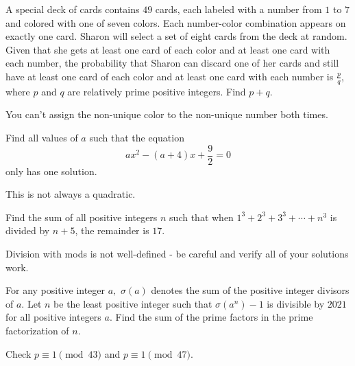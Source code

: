 \documentclass[mast]{lucky}
\begin{document}
\begin{prob}[AIME II 2017/9]{6}
A special deck of cards contains $49$ cards, each labeled with a number from $1$ to $7$ and colored with one of seven colors. Each number-color combination appears on exactly one card. Sharon will select a set of eight cards from the deck at random. Given that she gets at least one card of each color and at least one card with each number, the probability that Sharon can discard one of her cards and still have at least one card of each color and at least one card with each number is $\frac{p}{q}$, where $p$ and $q$ are relatively prime positive integers. Find $p+q$.
\begin{mistakes}
    \begin{mistake}
        You can't assign the non-unique color to the non-unique number both times.
    \end{mistake}
\end{mistakes}
\end{prob}

\begin{prob}[NARML 2020/3]{6}
Find all values of $a$ such that the equation \[ax^2-(a+4)x+\frac{9}{2}=0\] only has one solution.
\begin{mistakes}
    \begin{mistake}
        This is not always a quadratic.
    \end{mistake}
\end{mistakes}
\end{prob}
    
\begin{prob}[AIME II 2020/10]{6}
Find the sum of all positive integers $n$ such that when $1^3+2^3+3^3+\cdots+n^3$ is divided by $n+5$, the remainder is $17.$
\begin{mistakes}
    \begin{mistake}
        Division with mods is not well-defined - be careful and verify all of your solutions work.
    \end{mistake}
\end{mistakes}
\end{prob}

\begin{prob}[AIME I 2021/14]{6}
For any positive integer $a,$ $\sigma(a)$ denotes the sum of the positive integer divisors of $a.$ Let $n$ be the least positive integer such that $\sigma(a^n)-1$ is divisible by $2021$ for all positive integers $a.$ Find the sum of the prime factors in the prime factorization of $n.$
\begin{mistakes}
    \begin{mistake}
        Check $p\equiv 1\pmod{43}$ and $p\equiv 1\pmod{47}.$
    \end{mistake}
\end{mistakes}
\end{prob}
\end{document}
